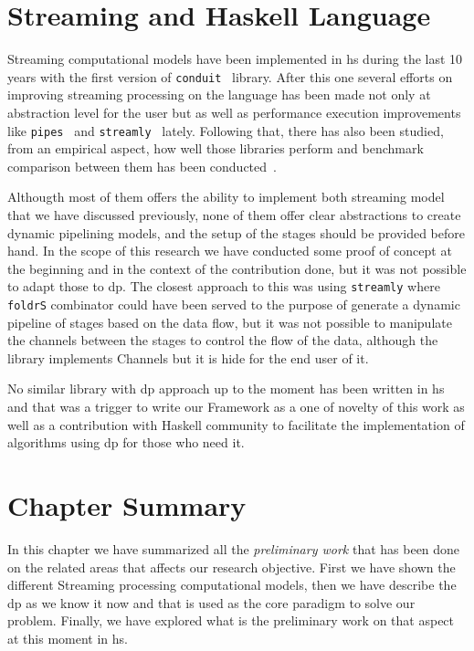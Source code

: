   

\section{Streaming and Haskell Language}
Streaming computational models have been implemented in \acrfull{hs} during the last 10 years with the first version of \texttt{conduit}~\cite{conduit} library.
After this one several efforts on improving streaming processing on the language has been made not only at abstraction level for the user but as well as performance execution 
improvements like \texttt{pipes}~\cite{pipes} and \texttt{streamly}~\cite{streamly} lately.
Following that, there has also been studied, from an empirical aspect, how well those libraries perform and benchmark comparison between them has been conducted~\cite{benchstreamhs}.

Althougth most of them offers the ability to implement both streaming model that we have discussed previously, none of them offer clear abstractions to create dynamic pipelining models, and
the setup of the stages should be provided before hand. In the scope of this research we have conducted some proof of concept at the beginning and in the context of the contribution done, 
but it was not possible to adapt those to \acrshort{dp}. The closest approach to this was using \texttt{streamly} where \texttt{foldrS} combinator
could have been served to the purpose of generate a dynamic pipeline of stages based on the data flow, but it was not possible to manipulate the channels between the stages to control the flow 
of the data, although the library implements Channels but it is hide for the end user of it.

No similar library with \acrshort{dp} approach up to the moment has been written in \acrlong{hs} and that was a trigger to write our Framework as a one of novelty of this work as well as a contribution
with Haskell community to facilitate the implementation of algorithms using \acrshort{dp} for those who need it.

\section{Chapter Summary}
In this chapter we have summarized all the \emph{preliminary work} that has been done on the related areas that affects our research objective.
First we have shown the different Streaming processing computational models, then we have describe the \acrshort{dp} as we know it now and that is used 
as the core paradigm to solve our problem. Finally, we have explored what is the preliminary work on that aspect at this moment in \acrshort{hs}. 

